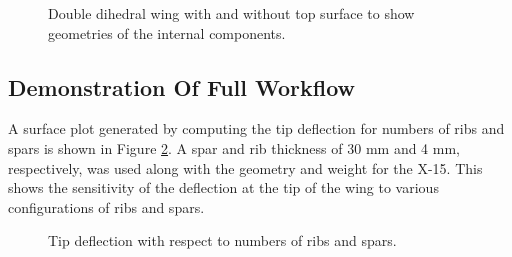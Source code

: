 \documentclass[conf]{new-aiaa}
\begin{document}
\begin{figure}[H]
  \centering
  \caption{
        Double dihedral wing with and without top surface to show
        geometries of the internal components.}
  \label{fig:di_in_out}
\end{figure}

\subsection{Demonstration Of Full Workflow}
A surface plot generated by computing the 
tip deflection for numbers of ribs and spars is shown in 
Figure \ref{fig:tip_deflection_surface}.
A spar and rib thickness of 30 mm and 4 mm, respectively, was used
along with the geometry and weight for the X-15.
This shows the sensitivity of the deflection at the
tip of the wing to various configurations of 
ribs and spars.

\begin{figure}[H]
  \centering
  \caption{ 
    Tip deflection with respect to numbers of ribs and spars. }
  \label{fig:tip_deflection_surface}
\end{figure}
\end{document}
